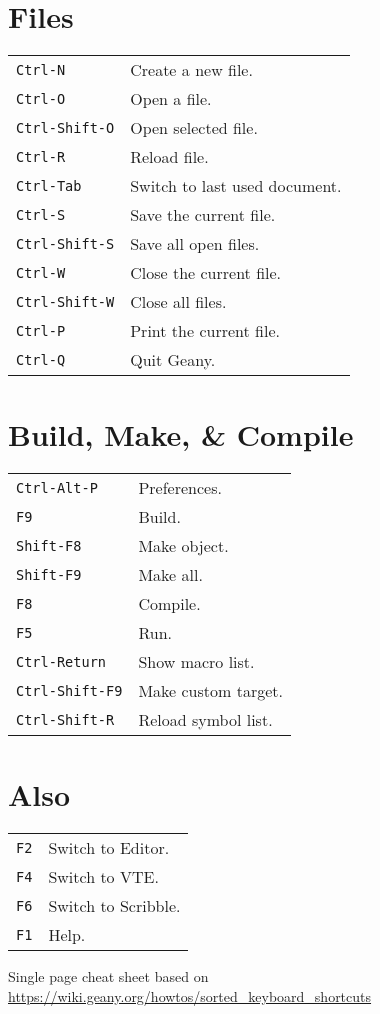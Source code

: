 \begin{multicols}{3}
	\section{Files}
	\begin{tabular}{@{}ll@{}}
		\verb!Ctrl-N!       & Create a new file.            \\
		\verb!Ctrl-O!       & Open a file.                  \\
		\verb!Ctrl-Shift-O! & Open selected file.           \\
		\verb!Ctrl-R!       & Reload file.                  \\
		\verb!Ctrl-Tab!     & Switch to last used document. \\
		\verb!Ctrl-S!       & Save the current file.        \\
		\verb!Ctrl-Shift-S! & Save all open files.          \\
		\verb!Ctrl-W!       & Close the current file.       \\
		\verb!Ctrl-Shift-W! & Close all files.              \\
		\verb!Ctrl-P!       & Print the current file.       \\
		\verb!Ctrl-Q!       & Quit Geany.                   \\
	\end{tabular}

	\section{Build, Make, \& Compile}
	\begin{tabular}{@{}ll@{}}
		\verb!Ctrl-Alt-P!    & Preferences.        \\
		\verb!F9!            & Build.              \\
		\verb!Shift-F8!      & Make object.        \\
		\verb!Shift-F9!      & Make all.           \\
		\verb!F8!            & Compile.            \\
		\verb!F5!            & Run.                \\
		\verb!Ctrl-Return!   & Show macro list.    \\
		\verb!Ctrl-Shift-F9! & Make custom target. \\
		\verb!Ctrl-Shift-R!  & Reload symbol list. \\
	\end{tabular}

	\section{Also}
	\begin{tabular}{@{}ll@{}}
		\verb!F2! & Switch to Editor.   \\
		\verb!F4! & Switch to VTE.      \\
		\verb!F6! & Switch to Scribble. \\
		\verb!F1! & Help.               \\
	\end{tabular}

	Single page cheat sheet based on \url{https://wiki.geany.org/howtos/sorted_keyboard_shortcuts}

\end{multicols}

